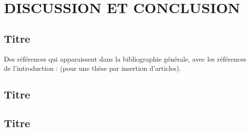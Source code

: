 \chapter{\textbf{DISCUSSION ET CONCLUSION}}
\section{Titre}
Des références qui apparaissent dans la bibliographie générale, avec les références de l'introduction : \cite{Lang2009,Ovaskainen2017} (pour une thèse par insertion d'articles).

\lipsum[1]

\section{Titre}

\lipsum[1]

\section{Titre} 
\lipsum[1]